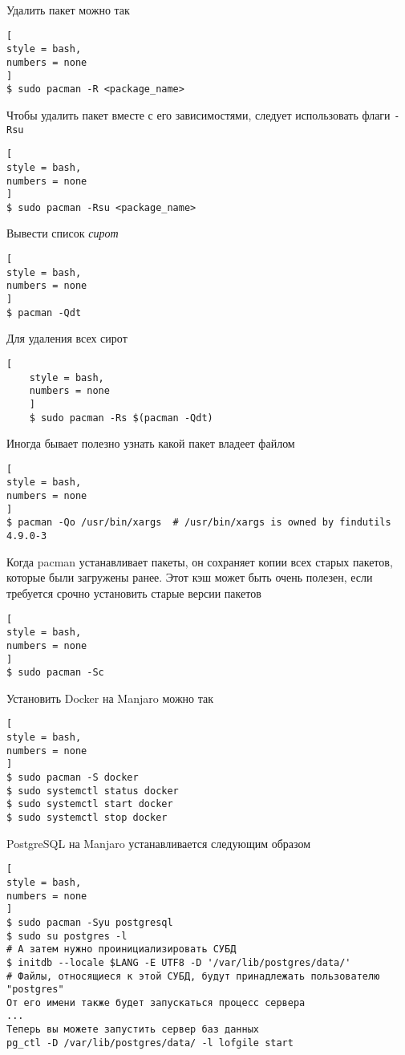 \documentclass[%
	11pt,
	a4paper,
	utf8,
		]{article}
\begin{document}

Удалить пакет можно так
\begin{lstlisting}[
style = bash,
numbers = none
]
$ sudo pacman -R <package_name>
\end{lstlisting}

Чтобы удалить пакет вместе с его зависимостями, следует использовать флаги \verb*|-Rsu|
\begin{lstlisting}[
style = bash,
numbers = none
]
$ sudo pacman -Rsu <package_name>
\end{lstlisting}

Вывести список \emph{сирот}
\begin{lstlisting}[
style = bash,
numbers = none
]
$ pacman -Qdt
\end{lstlisting}

Для удаления всех сирот
\begin{lstlisting}[
	style = bash,
	numbers = none
	]
	$ sudo pacman -Rs $(pacman -Qdt)
\end{lstlisting}

Иногда бывает полезно узнать какой пакет владеет файлом
\begin{lstlisting}[
style = bash,
numbers = none
]
$ pacman -Qo /usr/bin/xargs  # /usr/bin/xargs is owned by findutils 4.9.0-3
\end{lstlisting}

Когда pacman устанавливает пакеты, он сохраняет копии всех старых пакетов, которые были загружены ранее. Этот кэш может быть очень полезен, если требуется срочно установить старые версии пакетов
\begin{lstlisting}[
style = bash,
numbers = none
]
$ sudo pacman -Sc
\end{lstlisting}

Установить Docker на Manjaro можно так
\begin{lstlisting}[
style = bash,
numbers = none
]
$ sudo pacman -S docker
$ sudo systemctl status docker
$ sudo systemctl start docker
$ sudo systemctl stop docker
\end{lstlisting}

PostgreSQL на Manjaro устанавливается следующим образом
\begin{lstlisting}[
style = bash,
numbers = none
]
$ sudo pacman -Syu postgresql
$ sudo su postgres -l
# А затем нужно проинициализировать СУБД
$ initdb --locale $LANG -E UTF8 -D '/var/lib/postgres/data/'
# Файлы, относящиеся к этой СУБД, будут принадлежать пользователю "postgres"
От его имени также будет запускаться процесс сервера
...
Теперь вы можете запустить сервер баз данных
pg_ctl -D /var/lib/postgres/data/ -l lofgile start
\end{lstlisting}
\end{document}
